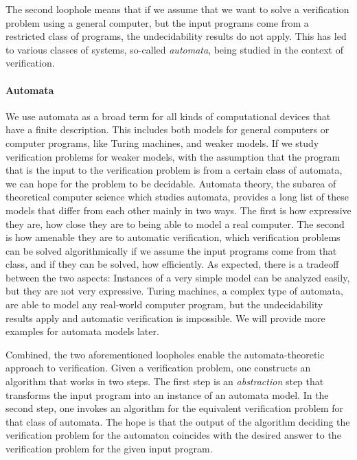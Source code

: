 \documentclass[../../diss.tex]{subfiles}
\begin{document}
The second loophole means that if we assume that we want to solve a verification problem using a general computer, but the input programs come from a restricted class of programs, the undecidability results do not apply.
This has led to various classes of systems, so-called \emph{automata}, being studied in the context of verification.


\paragraph{Automata}

We use automata as a broad term for all kinds of computational devices that have a finite description.
This includes both models for general computers or computer programs, like Turing machines, and weaker models.
If we study verification problems for weaker models, \ie with the assumption that the program that is the input to the verification problem is from a certain class of automata, we can hope for the problem to be decidable.
Automata theory, the subarea of theoretical computer science which studies automata, provides a long list of these models that differ from each other mainly in two ways.
The first is how expressive they are, \ie how close they are to being able to model a real computer.
The second is how amenable they are to automatic verification, \ie which verification problems can be solved algorithmically if we assume the input programs come from that class, and if they can be solved, how efficiently.
As expected, there is a tradeoff between the two aspects:
Instances of a very simple model can be analyzed easily, but they are not very expressive.
Turing machines, a complex type of automata, are able to model any real-world computer program, but the undecidability results apply and automatic verification is impossible.
We will provide more examples for automata models later.

Combined, the two aforementioned loopholes enable the automata-theoretic approach to verification.
Given a verification problem, one constructs an algorithm that works in two steps.
The first step is an \emph{abstraction} step that transforms the input program into an instance of an automata model.
In the second step, one invokes an algorithm for the equivalent verification problem for that class of automata.
The hope is that the output of the algorithm deciding the verification problem for the automaton coincides with the desired answer to the verification problem for the given input program.
\end{document}
